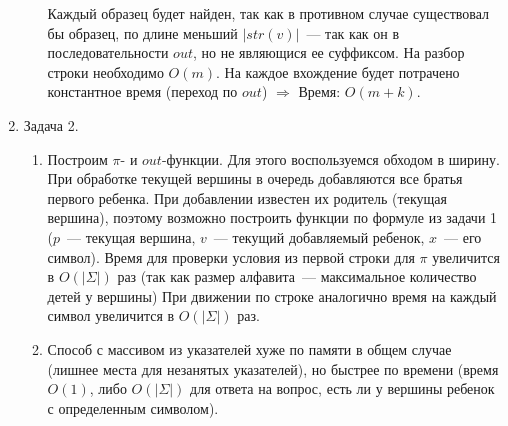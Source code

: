 \documentclass{article}
\begin{document}
\begin{enumerate}
\begin{enumerate}
Каждый образец будет найден, так как в противном случае существовал бы образец, по длине меньший $|str(v)|$~--- так как он в последовательности $out$, но не являющися ее суффиксом.
На разбор строки необходимо $O(m)$. На каждое вхождение будет потрачено константное время (переход по $out$) $\Rightarrow$\newline
Время: $O(m+k)$.
\end{enumerate}
\item Задача 2.
\begin{enumerate}
\item Построим $\pi$- и $out$-функции. Для этого воспользуемся обходом в ширину. При обработке текущей вершины в очередь добавляются все братья первого ребенка. При добавлении известен их родитель (текущая вершина), поэтому возможно построить функции по формуле из задачи 1 ($p$~--- текущая вершина, $v$~--- текущий добавляемый ребенок, $x$~--- его символ). Время для проверки условия из первой строки для $\pi$ увеличится в $O(|\Sigma|)$ раз (так как размер алфавита~--- максимальное количество детей у вершины)\newline
При движении по строке аналогично время на каждый символ увеличится в $O(|\Sigma|)$ раз.
\item Способ с массивом из указателей хуже по памяти в общем случае (лишнее места для незанятых указателей), но быстрее по времени (время $O(1)$, либо $O(|\Sigma|)$ для ответа на вопрос, есть ли у вершины ребенок с определенным символом).
\end{enumerate}
\end{enumerate}
\end{document}
